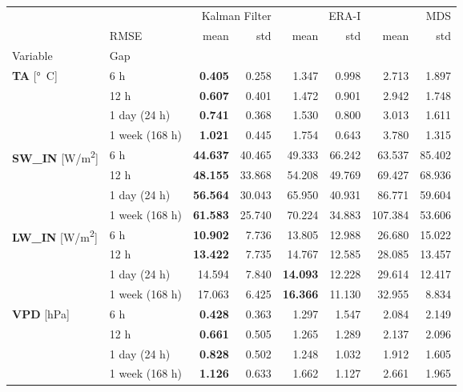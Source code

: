 \begin{table}
\centering
\caption{\CapTheTable}
\label{tbl:the_table}
\begin{tabular}{p{2.1cm}l|rr|rr|rr}
\toprule
 &  & \multicolumn{2}{r}{Kalman Filter} & \multicolumn{2}{r}{ERA-I} & \multicolumn{2}{r}{MDS} \\
 & RMSE & mean & std & mean & std & mean & std \\
Variable & Gap &  &  &  &  &  &  \\
\midrule
\multirow[c]{4}{*}{\parbox{2.1cm}{\textbf{TA} [\si{°C}]}} & 6 h & \bfseries 0.405 & 0.258 & 1.347 & 0.998 & 2.713 & 1.897 \\
 & 12 h & \bfseries 0.607 & 0.401 & 1.472 & 0.901 & 2.942 & 1.748 \\
 & 1 day (24 h) & \bfseries 0.741 & 0.368 & 1.530 & 0.800 & 3.013 & 1.611 \\
 & 1 week (168 h) & \bfseries 1.021 & 0.445 & 1.754 & 0.643 & 3.780 & 1.315 \\
\cline{1-8}
\multirow[c]{4}{*}{\parbox{2.1cm}{\textbf{SW\_IN} [\si{W/m^2}]}} & 6 h & \bfseries 44.637 & 40.465 & 49.333 & 66.242 & 63.537 & 85.402 \\
 & 12 h & \bfseries 48.155 & 33.868 & 54.208 & 49.769 & 69.427 & 68.936 \\
 & 1 day (24 h) & \bfseries 56.564 & 30.043 & 65.950 & 40.931 & 86.771 & 59.604 \\
 & 1 week (168 h) & \bfseries 61.583 & 25.740 & 70.224 & 34.883 & 107.384 & 53.606 \\
\cline{1-8}
\multirow[c]{4}{*}{\parbox{2.1cm}{\textbf{LW\_IN} [\si{W/m^2}]}} & 6 h & \bfseries 10.902 & 7.736 & 13.805 & 12.988 & 26.680 & 15.022 \\
 & 12 h & \bfseries 13.422 & 7.735 & 14.767 & 12.585 & 28.085 & 13.457 \\
 & 1 day (24 h) & 14.594 & 7.840 & \bfseries 14.093 & 12.228 & 29.614 & 12.417 \\
 & 1 week (168 h) & 17.063 & 6.425 & \bfseries 16.366 & 11.130 & 32.955 & 8.834 \\
\cline{1-8}
\multirow[c]{4}{*}{\parbox{2.1cm}{\textbf{VPD} [\si{hPa}]}} & 6 h & \bfseries 0.428 & 0.363 & 1.297 & 1.547 & 2.084 & 2.149 \\
 & 12 h & \bfseries 0.661 & 0.505 & 1.265 & 1.289 & 2.137 & 2.096 \\
 & 1 day (24 h) & \bfseries 0.828 & 0.502 & 1.248 & 1.032 & 1.912 & 1.605 \\
 & 1 week (168 h) & \bfseries 1.126 & 0.633 & 1.662 & 1.127 & 2.661 & 1.965 \\

\end{tabular}
\end{table}
